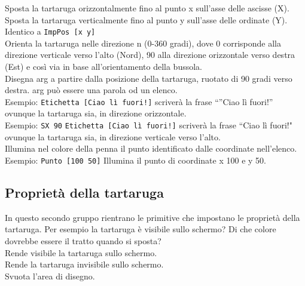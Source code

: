  Sposta la tartaruga orizzontalmente fino al punto x sull'asse delle ascisse (X).\\

 Sposta la tartaruga verticalmente fino al punto y sull'asse delle ordinate (Y).\\

 Identico a \texttt{ImpPos {[}x y{]}}\\

 Orienta la tartaruga nelle direzione n (0-360 gradi), dove 0 corrisponde alla direzione verticale verso l'alto (Nord), 90 alla direzione orizzontale verso destra (Est) e così via in base all'orientamento della bussola. \\

 Disegna arg a partire dalla posizione della tartaruga, ruotato di 90 gradi verso destra. arg può essere una parola od un elenco.\\
 Esempio: \texttt{Etichetta [Ciao lì fuori!]} scriverà la frase ``''Ciao lì fuori!'' ovunque la tartaruga sia, in direzione orizzontale.\\
 Esempio: \texttt{SX 90} \texttt{Etichetta [Ciao lì fuori!]} scriverà la frase ``Ciao lì fuori!" ovunque la tartaruga sia, in direzione verticale verso l'alto.\\

 Illumina nel colore della penna il punto identificato dalle coordinate nell'elenco.\\
Esempio: \texttt{Punto [100 50]} Illumina il punto di coordinate x 100 e y 50.\\
\subsection{Proprietà della tartaruga}
In questo secondo gruppo rientrano le primitive che impostano le proprietà della tartaruga. Per esempio la tartaruga è visibile sullo schermo? Di che colore dovrebbe essere il tratto quando si sposta? \\

 Rende visibile la tartaruga sullo schermo.\\

 Rende la tartaruga invisibile sullo schermo.\\

 Svuota l'area di disegno.\\

